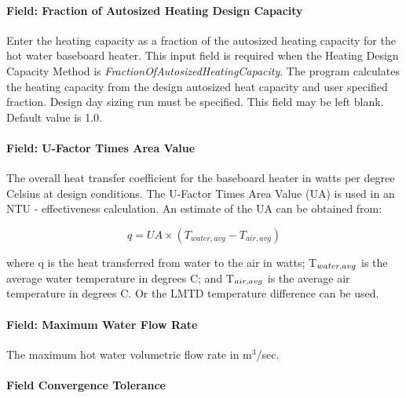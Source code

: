 \paragraph{Field: Fraction of Autosized Heating Design Capacity}\label{field-fraction-of-autosized-heating-design-capacity-3}

Enter the heating capacity as a fraction of the autosized heating capacity for the hot water baseboard heater. This input field is required when the Heating Design Capacity Method is \emph{FractionOfAutosizedHeatingCapacity}. The program calculates the heating capacity from the design autosized heat capacity and user specified fraction. Design day sizing run must be specified. This field may be left blank. Default value is 1.0.

\paragraph{Field: U-Factor Times Area Value}\label{field-u-factor-times-area-value-000}

The overall heat transfer coefficient for the baseboard heater in watts per degree Celsius at design conditions. The U-Factor Times Area Value (UA) is used in an NTU - effectiveness calculation. An estimate of the UA can be obtained from:

\begin{equation}
q = UA \times ({T_{water,avg}} - {T_{air,avg}})
\end{equation}

where q is the heat transferred from water to the air in watts; T\(_{water,\\ avg}\) is the average water temperature in degrees C; and T\(_{air,\\ avg}\) is the average air temperature in degrees C. Or the LMTD temperature difference can be used.

\paragraph{Field: Maximum Water Flow Rate}\label{field-maximum-water-flow-rate-1-000}

The maximum hot water volumetric flow rate in m\(^{3}\)/sec.

\paragraph{Field Convergence Tolerance}\label{field-convergence-tolerance-2-000}

